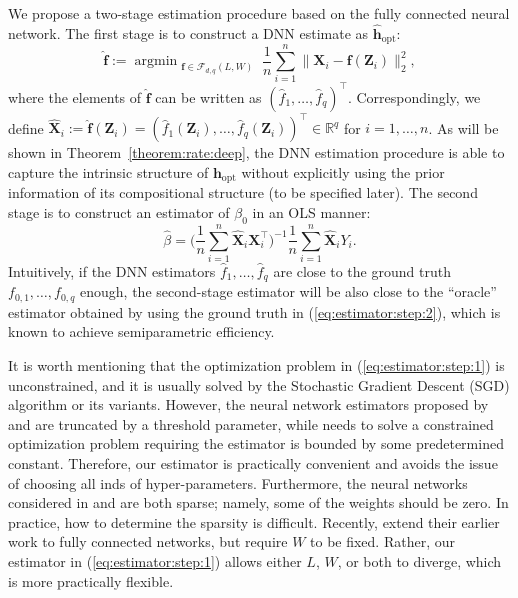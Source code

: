 \documentclass[11pt, preprint]{imsart}
\DeclareMathOperator*{\argmin}{argmin}
\numberwithin{equation}{section}
\def \mcF{\mathcal{F}}
\def \bfX{\mathbf{X}}
\def \bfZ{\mathbf{Z}}
\def \bfh{\mathbf{h}}
\def \bff{\mathbf{f}}
\def \bff{\mathbf{f}}
\theoremstyle{plain}
\theoremstyle{definition}
\begin{document}
We propose a two-stage estimation procedure based on the fully connected neural network. The first stage is to construct a DNN estimate as $\widehat{\bfh}_{\textrm{opt}}$: 
\begin{equation}\label{eq:estimator:step:1}
	\widehat{\bff}:=\argmin_{\substack{\bff\in \mcF_{d,q}(L, W)}}\frac{1}{n}\sum_{i=1}^n\|\bfX_i-\bff(\bfZ_i)\|_2^2,
\end{equation}
where the elements of $\widehat{\bff}$ can be written as $(\widehat{f}_1, \ldots, \widehat{f}_q)^\top$. Correspondingly, we define $\widehat{\bfX}_i:=\widehat{\bff}(\bfZ_i)=(\widehat{f}_1(\bfZ_i),\ldots, \widehat{f}_q(\bfZ_i))^\top\in \mathbb{R}^q$ for $i=1,\ldots, n$. As will be shown in Theorem~\ref{theorem:rate:deep}, the DNN estimation procedure is able to capture the intrinsic structure of ${\bfh}_{\textrm{opt}}$ without explicitly using the prior information of its compositional structure (to be specified later). The second stage is to construct an estimator of $\beta_0$ in an OLS manner:
\begin{equation}\label{eq:estimator:step:2}
	\widehat{\beta}=\bigg(\frac{1}{n}\sum_{i=1}^n\widehat{\bfX}_i\bfX_i^\top\bigg)^{-1}\frac{1}{n}\sum_{i=1}^n\widehat{\bfX}_i Y_i.
\end{equation}
Intuitively, if the DNN estimators $\widehat{f}_1, \ldots, \widehat{f}_q$ are close to the ground truth $f_{0,1},\ldots, f_{0, q}$ enough, the second-stage estimator will be also close to the ``oracle''  estimator obtained by using the ground truth in (\ref{eq:estimator:step:2}), which is known to achieve semiparametric efficiency. 

It is worth mentioning that the optimization problem in (\ref{eq:estimator:step:1}) is unconstrained, and it is usually solved by the Stochastic Gradient Descent (SGD) algorithm or its variants. However, the neural network estimators proposed by \cite{bk19} and \cite{mk19}  are truncated by a threshold parameter, while \cite{s19} needs to solve a constrained optimization problem requiring the estimator is bounded by some predetermined constant. Therefore, our estimator is practically convenient and avoids the issue of choosing all inds of hyper-parameters. Furthermore, the neural networks considered in \cite{bk19} and \cite{s19} are both sparse; namely, some of the weights should be zero. In practice, how to determine the sparsity is difficult. Recently, \cite{mk19} extend their earlier work \cite{bk19} to fully connected networks, but require $W$ to be fixed. Rather, our estimator in (\ref{eq:estimator:step:1}) allows either $L$, $W$, or both to diverge, which is more practically flexible. 
\end{document}
